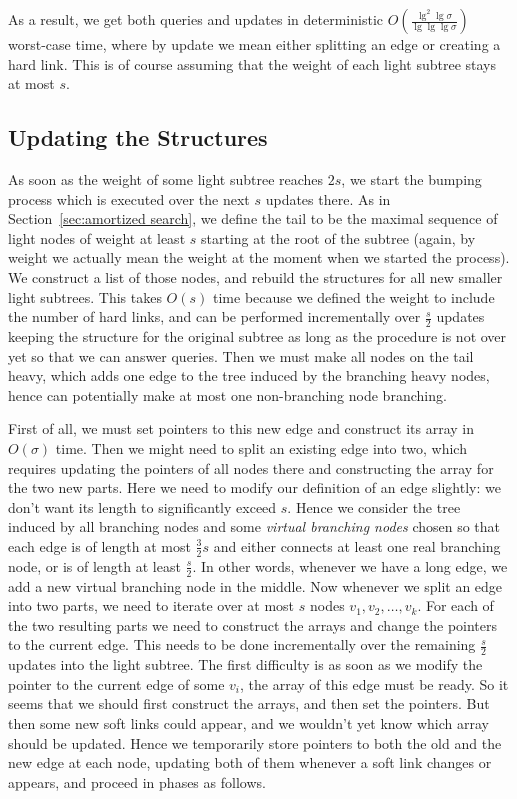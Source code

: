 \documentclass[11pt,onecolumn,final]{article} \usepackage{a4}
\theoremstyle{plain}
\theoremstyle{remark}
\begin{document}
As a result, we get both queries and updates in deterministic $O(\frac{\lg^2\lg\sigma}{\lg\lg\lg\sigma})$ worst-case time, where by update we mean either splitting an edge or creating a hard link. This is of course assuming that the weight of each light subtree stays at most $s$. 

\subsection{Updating the Structures}
As soon as the weight of some light subtree reaches $2s$, we start the bumping process which is executed over the next $s$ updates there. As in Section~\ref{sec:amortized search}, we define the tail to be the maximal sequence of light nodes of weight at least $s$ starting at the root of the subtree (again, by weight we actually mean the weight at the moment when we started the process). We construct a list of those nodes, and rebuild the structures for all new smaller light subtrees. This takes $O(s)$ time because we defined the weight to include the number of hard links, and can be performed incrementally over $\frac{s}{2}$ updates keeping the structure for the original subtree as long as the procedure is not over yet so that we can answer queries. Then we must make all nodes on the tail heavy, which adds one edge to the tree induced by the branching heavy nodes, hence can potentially make at most one non-branching node branching.

First of all, we must set pointers to this new edge and construct its array in $O(\sigma)$ time. Then we might need to split an existing edge into two, which requires updating the pointers of all nodes there and constructing the array for the two new parts. Here we need to modify our definition of an edge slightly: we don't want its length to significantly exceed $s$. Hence we consider the tree induced by all branching nodes and some \emph{virtual branching nodes} chosen so that each edge is of length at most $\frac{3}{2}s$ and either connects at least one real branching node, or is of length at least $\frac{s}{2}$. In other words, whenever we have a long edge, we add a new virtual branching node in the middle. Now whenever we split an edge into two parts, we need to iterate over at most $s$ nodes $v_1,v_2,\ldots,v_k$. For each of the two resulting parts we need to construct the arrays and change the pointers to the current edge. This needs to be done incrementally over the remaining $\frac{s}{2}$ updates into the light subtree. The first difficulty is as soon as we modify the pointer to the current edge of some $v_i$, the array of this edge must be ready. So it seems that we should first construct the arrays, and then set the pointers. But then some new soft links could appear, and we wouldn't yet know which array should be updated. Hence we temporarily store pointers to both the old and the new edge at each node, updating both of them whenever a soft link changes or appears, and proceed in phases as follows.
\end{document}
